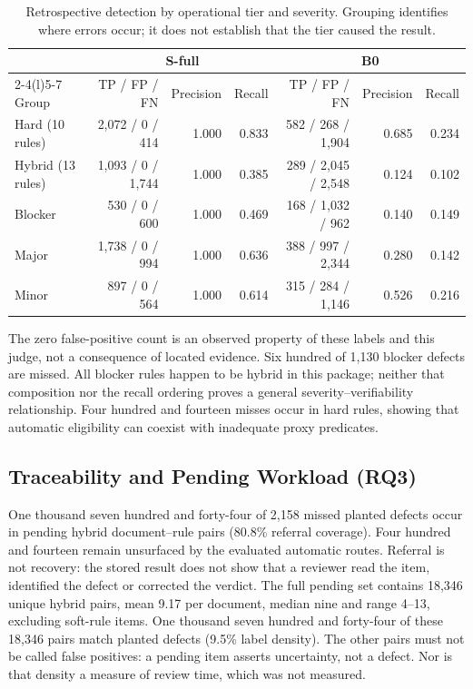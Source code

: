 \documentclass[computers,article,submit,moreauthors]{Definitions/mdpi}
\begin{document}
\begin{table}[!ht]
\caption{Retrospective detection by operational tier and severity. Grouping identifies where errors occur; it does not establish that the tier caused the result.}
\label{tab:tiers-results}
\centering\footnotesize
\begin{tabular}{@{}lrrrrrr@{}}
\toprule
& \multicolumn{3}{c}{S-full} & \multicolumn{3}{c}{B0} \\
\cmidrule(lr){2-4}\cmidrule(l){5-7}
Group & TP / FP / FN & Precision & Recall & TP / FP / FN & Precision & Recall \\
\midrule
Hard (10 rules) & 2,072 / 0 / 414 & 1.000 & 0.833 & 582 / 268 / 1,904 & 0.685 & 0.234 \\
Hybrid (13 rules) & 1,093 / 0 / 1,744 & 1.000 & 0.385 & 289 / 2,045 / 2,548 & 0.124 & 0.102 \\
\midrule
Blocker & 530 / 0 / 600 & 1.000 & 0.469 & 168 / 1,032 / 962 & 0.140 & 0.149 \\
Major & 1,738 / 0 / 994 & 1.000 & 0.636 & 388 / 997 / 2,344 & 0.280 & 0.142 \\
Minor & 897 / 0 / 564 & 1.000 & 0.614 & 315 / 284 / 1,146 & 0.526 & 0.216 \\
\bottomrule
\end{tabular}
\end{table}

The zero false-positive count is an observed property of these labels and this judge, not a consequence of located evidence. Six hundred of 1,130 blocker defects are missed. All blocker rules happen to be hybrid in this package; neither that composition nor the recall ordering proves a general severity--verifiability relationship. Four hundred and fourteen misses occur in hard rules, showing that automatic eligibility can coexist with inadequate proxy predicates.

\subsection{Traceability and Pending Workload (RQ3)}\label{sec:misses}

One thousand seven hundred and forty-four of 2,158 missed planted defects occur in pending hybrid document--rule pairs (80.8\% referral coverage). Four hundred and fourteen remain unsurfaced by the evaluated automatic routes. Referral is not recovery: the stored result does not show that a reviewer read the item, identified the defect or corrected the verdict. The full pending set contains 18,346 unique hybrid pairs, mean 9.17 per document, median nine and range 4--13, excluding soft-rule items. One thousand seven hundred and forty-four of these 18,346 pairs match planted defects (9.5\% label density). The other pairs must not be called false positives: a pending item asserts uncertainty, not a defect. Nor is that density a measure of review time, which was not measured.
\end{document}
